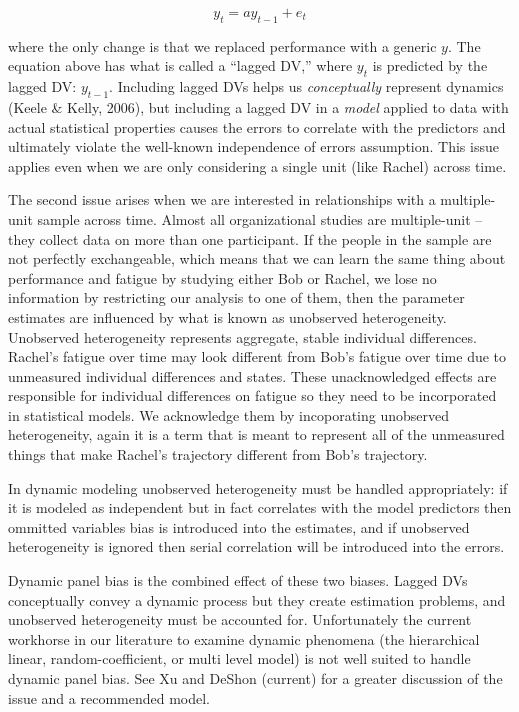 \documentclass[english,,man]{apa6}
\theoremstyle{definition}
\theoremstyle{definition}
\theoremstyle{definition}
\theoremstyle{remark}
\begin{document}
\begin{equation}
y_{t} = a y_{t-1} + e_{t}
\end{equation}

\noindent where the only change is that we replaced performance with a
generic \(y\). The equation above has what is called a \enquote{lagged
DV,} where \(y_{t}\) is predicted by the lagged DV: \(y_{t-1}\).
Including lagged DVs helps us \emph{conceptually} represent dynamics
(Keele \& Kelly, 2006), but including a lagged DV in a \emph{model}
applied to data with actual statistical properties causes the errors to
correlate with the predictors and ultimately violate the well-known
independence of errors assumption. This issue applies even when we are
only considering a single unit (like Rachel) across time.

The second issue arises when we are interested in relationships with a
multiple-unit sample across time. Almost all organizational studies are
multiple-unit -- they collect data on more than one participant. If the
people in the sample are not perfectly exchangeable, which means that we
can learn the same thing about performance and fatigue by studying
either Bob or Rachel, we lose no information by restricting our analysis
to one of them, then the parameter estimates are influenced by what is
known as unobserved heterogeneity. Unobserved heterogeneity represents
aggregate, stable individual differences. Rachel's fatigue over time may
look different from Bob's fatigue over time due to unmeasured individual
differences and states. These unacknowledged effects are responsible for
individual differences on fatigue so they need to be incorporated in
statistical models. We acknowledge them by incoporating unobserved
heterogeneity, again it is a term that is meant to represent all of the
unmeasured things that make Rachel's trajectory different from Bob's
trajectory.

In dynamic modeling unobserved heterogeneity must be handled
appropriately: if it is modeled as independent but in fact correlates
with the model predictors then ommitted variables bias is introduced
into the estimates, and if unobserved heterogeneity is ignored then
serial correlation will be introduced into the errors.

Dynamic panel bias is the combined effect of these two biases. Lagged
DVs conceptually convey a dynamic process but they create estimation
problems, and unobserved heterogeneity must be accounted for.
Unfortunately the current workhorse in our literature to examine dynamic
phenomena (the hierarchical linear, random-coefficient, or multi level
model) is not well suited to handle dynamic panel bias. See Xu and
DeShon (current) for a greater discussion of the issue and a recommended
model.
\end{document}
